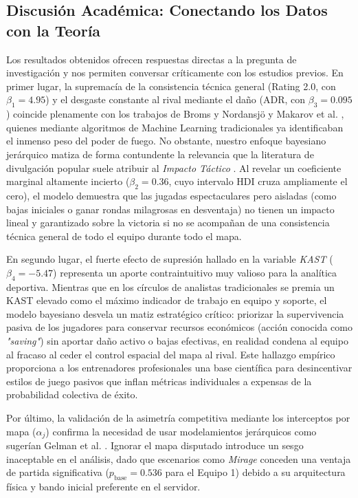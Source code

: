 \documentclass[twocolumn,10pt]{article}
\begin{document}
\subsection{Discusión Académica: Conectando los Datos con la Teoría}

Los resultados obtenidos ofrecen respuestas directas a la pregunta de investigación y nos permiten conversar críticamente con los estudios previos. En primer lugar, la supremacía de la consistencia técnica general (Rating 2.0, con $\beta_1 = 4.95$) y el desgaste constante al rival mediante el daño (ADR, con $\beta_3 = 0.095$) coincide plenamente con los trabajos de Broms y Nordansjö \cite{csgodataset2020} y Makarov et al. \cite{makarov2017predicting}, quienes mediante algoritmos de Machine Learning tradicionales ya identificaban el inmenso peso del poder de fuego. No obstante, nuestro enfoque bayesiano jerárquico matiza de forma contundente la relevancia que la literatura de divulgación popular suele atribuir al \textit{Impacto Táctico} \cite{goldin2021bayesian}. Al revelar un coeficiente marginal altamente incierto ($\beta_2 = 0.36$, cuyo intervalo HDI cruza ampliamente el cero), el modelo demuestra que las jugadas espectaculares pero aisladas (como bajas iniciales o ganar rondas milagrosas en desventaja) no tienen un impacto lineal y garantizado sobre la victoria si no se acompañan de una consistencia técnica general de todo el equipo durante todo el mapa.

En segundo lugar, el fuerte efecto de supresión hallado en la variable \textit{KAST} ($\beta_4 = -5.47$) representa un aporte contraintuitivo muy valioso para la analítica deportiva. Mientras que en los círculos de analistas tradicionales se premia un KAST elevado como el máximo indicador de trabajo en equipo y soporte, el modelo bayesiano desvela un matiz estratégico crítico: priorizar la supervivencia pasiva de los jugadores para conservar recursos económicos (acción conocida como \textit{"saving"}) sin aportar daño activo o bajas efectivas, en realidad condena al equipo al fracaso al ceder el control espacial del mapa al rival. Este hallazgo empírico proporciona a los entrenadores profesionales una base científica para desincentivar estilos de juego pasivos que inflan métricas individuales a expensas de la probabilidad colectiva de éxito.

Por último, la validación de la asimetría competitiva mediante los interceptos por mapa ($\alpha_j$) confirma la necesidad de usar modelamientos jerárquicos como sugerían Gelman et al. \cite{gelman2013bayesian}. Ignorar el mapa disputado introduce un sesgo inaceptable en el análisis, dado que escenarios como \textit{Mirage} conceden una ventaja de partida significativa ($p_{\text{base}} = 0.536$ para el Equipo 1) debido a su arquitectura física y bando inicial preferente en el servidor.
\end{document}
